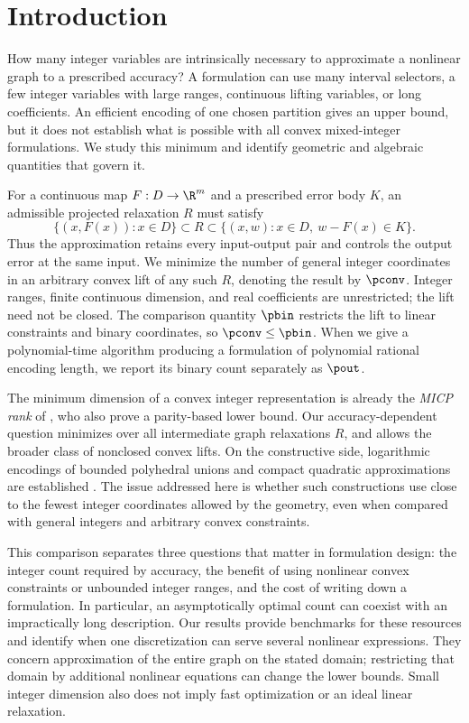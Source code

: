 \section{Introduction}\label{sec:introduction}

How many integer variables are intrinsically necessary to approximate a
nonlinear graph to a prescribed accuracy? A formulation can use many
interval selectors, a few integer variables with large ranges, continuous
lifting variables, or long coefficients. An efficient encoding of one
chosen partition gives an upper bound, but it does not establish what is
possible with all convex mixed-integer formulations. We study this minimum
and identify geometric and algebraic quantities that govern it.

For a continuous map $F:D\to\R^m$ and a prescribed error body $K$, an
admissible projected relaxation $R$ must satisfy
\[
 \{(x,F(x)):x\in D\}\subset R
 \subset\{(x,w):x\in D,\ w-F(x)\in K\}.
\]
Thus the approximation retains every input-output pair and controls the
output error at the same input. We minimize the number of general integer
coordinates in an arbitrary convex lift of any such $R$, denoting the
result by $\pconv$. Integer ranges, finite continuous dimension, and real
coefficients are unrestricted; the lift need not be closed. The comparison
quantity $\pbin$ restricts the lift to linear constraints and binary
coordinates, so $\pconv\le\pbin$. When we give a polynomial-time algorithm
producing a formulation of polynomial rational encoding length, we report
its binary count separately as $\pout$.

The minimum dimension of a convex integer representation is already the
\emph{MICP rank} of \citet[Definition 4.3]{lubin2022}, who also prove a
parity-based lower bound. Our accuracy-dependent question minimizes over
all intermediate graph relaxations $R$, and allows the broader class of
nonclosed convex lifts. On the constructive side, logarithmic encodings
of bounded polyhedral unions and compact quadratic approximations are established
\citep{vielma2018,beach2022}. The issue addressed here is whether such
constructions use close to the fewest integer coordinates allowed by the
geometry, even when compared with general integers and arbitrary convex
constraints.

This comparison separates three questions that matter in formulation
design: the integer count required by accuracy, the benefit of using
nonlinear convex constraints or unbounded integer ranges, and the cost of
writing down a formulation. In particular, an asymptotically optimal count
can coexist with an impractically long description. Our results provide
benchmarks for these resources and identify when one discretization can
serve several nonlinear expressions. They concern approximation of the
entire graph on the stated domain; restricting that domain by additional
nonlinear equations can change the lower bounds. Small integer dimension
also does not imply fast optimization or an ideal linear relaxation.

